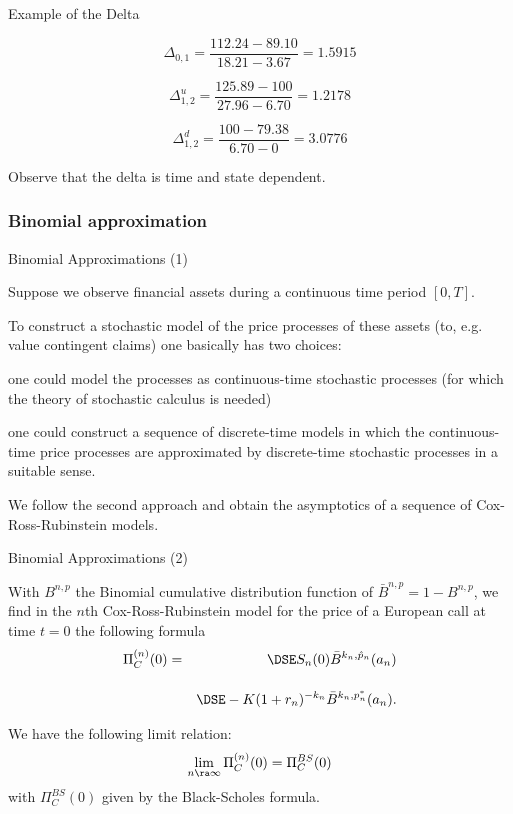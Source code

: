 
{Example of the Delta}
\item<1->
$$
\Delta_{0,1}=\frac{112.24-89.10}{18.21-3.67}=1.5915
$$
\item<2->
$$
\Delta^u_{1,2}=\frac{125.89-100}{27.96-6.70}=1.2178
$$
\item<3->
$$
\Delta^d_{1,2}=\frac{100-79.38}{6.70-0}=3.0776
$$
\item<4-> Observe that the delta is time and state dependent.

\subsubsection{Binomial approximation}

{Binomial Approximations (1)}

  \item Suppose we observe financial assets during a continuous time
period $[0,T]$.
\item To construct a stochastic model of the price
processes of these assets (to, e.g. value contingent claims) one
basically has two choices:
  \item one could model the processes as
continuous-time stochastic processes (for which the theory of
stochastic calculus is needed)
\item  one could construct a sequence of discrete-time models in which
the continuous-time price processes are approximated by
discrete-time stochastic processes in a suitable sense.
\item  We follow the second approach and obtain the asymptotics
 of a sequence of Cox-Ross-Rubinstein models.

{Binomial Approximations (2)}

 \item
 With $B^{n, p}$ the Binomial cumulative distribution function of
 $\bar{B}^{n, p} = 1- B^{n, p}$, we find in the $n$th
Cox-Ross-Rubinstein model for the price of a European call at time
$t=0$ the following formula
\begin{eqnarray}\label{crrpricen}
\Pi_C^{(n)}(0) &=&\DSE S_n(0) \bar{B}^{k_n, \hat{p}_n}(a_n)\\*[12pt]\nonumber
&&\DSE- K
(1+r_n)^{-k_n} \bar{B}^{k_n, p^*_n}(a_n).
\end{eqnarray}
 \item We have the following limit relation:
$$
\lim_{n \ra \infty} \Pi_C^{(n)}(0) = \Pi_C^{BS}(0)
$$
with $\Pi_C^{BS}(0)$ given by the Black-Scholes formula.

